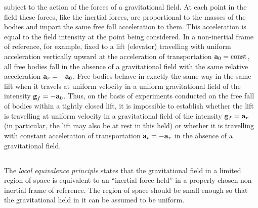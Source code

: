 subject to the action of the forces of a gravitational field. At each point in the field these forces, like the inertial forces, are proportional to the masses of the bodies and impart the same free fall acceleration to them. This acceleration is equal to the field intensity  at the point being considered.
In a non-inertial frame of reference, for example, fixed to a lift (elevator) travelling with uniform acceleration vertically upward at the acceleration of transportation $\vb{a}_{0}= \textrm{const}$, all free bodies fall in the absence of a gravitational field with the same relative acceleration $\vb{a}_{r} = -\vb{a}_{0}$. Free bodies behave in exactly the same way in the same lift when it travels at uni­form velocity in a uniform gravitational field of the intensity $\vb{g}_{f} = -\vb{a}_{0}$. Thus, on the basis of experiments conducted on the free fall of bodies within a tightly closed lift, it is impossible to establish whether the lift is travelling at uniform velocity in a gravitational field of the intensity $\vb{g}_{f} = \vb{a}_{r}$ (in partic­ular, the lift may also be at rest in this held) or whether it is travelling with constant acceleration of transportation $\vb{a}_{t} = -\vb{a}_{r}$ in the absence of a gravitational field.

\subsection{}\label{7.4.2} The \emph{local equivalence principle} states that the gravitational field in a limited region of space is equivalent to an ``inertial force held'' in a properly chosen non-inertial frame of reference. The region of space should be small enough so that the gravitational held in it can be assumed to be uniform.

